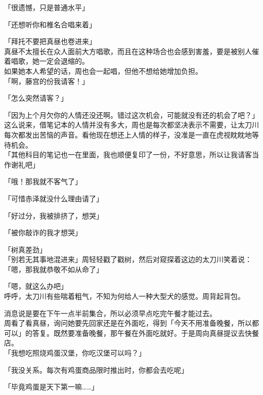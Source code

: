 「很遗憾，只是普通水平」

「还想听你和椎名合唱来着」

「拜托不要把真昼也卷进来」\\

真昼不太擅长在众人面前大方唱歌，而且在这种场合也会感到害羞，要是被别人催着唱歌，她一定会退缩的。\\

如果她本人希望的话，周也会一起唱，但他不想给她增加负担。\\

「啊，藤宫的份我请客！」

「怎么突然请客？」

「因为上个月欠你的人情还没还啊。错过这次机会，可能就没有还的机会了吧？」\\

这么说来，借笔记本的人情并没有多大，周也是每次都坚决表示不需要，让太刀川每次都发出苦恼的声音。看他现在想还上人情的样子，没准是一直在虎视眈眈地等待机会。\\

「其他科目的笔记也一在里面，我也顺便复印了一份，不好意思，所以让我请客当作谢礼吧」

「哦！那我就不客气了」

「可惜赤泽就没什么理由请了」

「好过分，我被排挤了，想哭」

「被你敲诈的我才想哭」

「树真差劲」\\

「别若无其事地混进来」周轻轻戳了戳树，然后对窥探着这边的太刀川笑着说：\\

「嗯，那我就恭敬不如从命了」

「嗯，就这么办吧」\\

呼呼，太刀川有些喘着粗气，不知为何给人一种大型犬的感觉。周背起背包。

消息说是要在下午一点半前集合，所以必须早点吃完午餐才能过去。\\

周看了看真昼，询问她要先回家还是在外面吃，得到「今天不用准备晚餐，所以都可以」的答复。既然要准备晚餐，那午餐在外面吃就好。于是周向真昼提议去快餐店。\\

「我想吃照烧鸡蛋汉堡，你吃汉堡可以吗？」

「我没关系。每次有鸡蛋商品限时推出时，你都会去吃呢」

「毕竟鸡蛋是天下第一嘛……」

